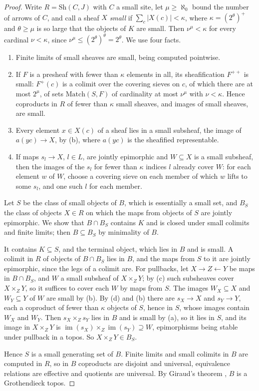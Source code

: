 \documentclass[11pt,a4paper]{amsart}
\theoremstyle{definition}
\theoremstyle{remark}
\begin{document}
\begin{proof}
Write $R=\mathrm{Sh}(C,J)$ with $C$ a small site, let $\mu\ge\aleph_0$ bound the number of arrows of $C$, and call a sheaf $X$ \emph{small} if $\sum_c|X(c)|<\kappa$, where $\kappa=(2^\theta)^+$ and $\theta\ge\mu$ is so large that the objects of $K$ are small. Then $\nu^\mu<\kappa$ for every cardinal $\nu<\kappa$, since $\nu^\mu\le(2^\theta)^{\theta}=2^\theta$. We use four facts.
\begin{enumerate}
\item[(a)] Finite limits of small sheaves are small, being computed pointwise.
\item[(b)] If $F$ is a presheaf with fewer than $\kappa$ elements in all, its sheafification $F^{++}$ is small: $F^+(c)$ is a colimit over the covering sieves on $c$, of which there are at most $2^\mu$, of sets $\mathrm{Match}(S,F)$ of cardinality at most $\nu^\mu$ with $\nu<\kappa$. Hence coproducts in $R$ of fewer than $\kappa$ small sheaves, and images of small sheaves, are small.
\item[(c)] Every element $x\in X(c)$ of a sheaf lies in a small subsheaf, the image of $a(yc)\to X$, by (b), where $a(yc)$ is the sheafified representable.
\item[(d)] If maps $s_l\to X$, $l\in L$, are jointly epimorphic and $W\subseteq X$ is a small subsheaf, then the images of the $s_l$ for fewer than $\kappa$ indices $l$ already cover $W$: for each element $w$ of $W$, choose a covering sieve on each member of which $w$ lifts to some $s_l$, and one such $l$ for each member.
\end{enumerate}
Let $S$ be the class of small objects of $B$, which is essentially a small set, and $B_S$ the class of objects $X\in R$ on which the maps from objects of $S$ are jointly epimorphic. We show that $B\cap B_S$ contains $K$ and is closed under small colimits and finite limits; then $B\subseteq B_S$ by minimality of $B$.

It contains $K\subseteq S$, and the terminal object, which lies in $B$ and is small. A colimit in $R$ of objects of $B\cap B_S$ lies in $B$, and the maps from $S$ to it are jointly epimorphic, since the legs of a colimit are. For pullbacks, let $X\to Z\leftarrow Y$ be maps in $B\cap B_S$, and $W$ a small subsheaf of $X\times_ZY$; by (c) such subsheaves cover $X\times_ZY$, so it suffices to cover each $W$ by maps from $S$. The images $W_X\subseteq X$ and $W_Y\subseteq Y$ of $W$ are small by (b). By (d) and (b) there are $s_X\to X$ and $s_Y\to Y$, each a coproduct of fewer than $\kappa$ objects of $S$, hence in $S$, whose images contain $W_X$ and $W_Y$. Then $s_X\times_Zs_Y$ lies in $B$ and is small by (a), so it lies in $S$, and its image in $X\times_ZY$ is $\operatorname{im}(s_X)\times_Z\operatorname{im}(s_Y)\supseteq W$, epimorphisms being stable under pullback in a topos. So $X\times_ZY\in B_S$.

Hence $S$ is a small generating set of $B$. Finite limits and small colimits in $B$ are computed in $R$, so in $B$ coproducts are disjoint and universal, equivalence relations are effective and quotients are universal. By Giraud's theorem \cite[exp.~IV]{sga4}, $B$ is a Grothendieck topos.
\end{proof}
\end{document}
